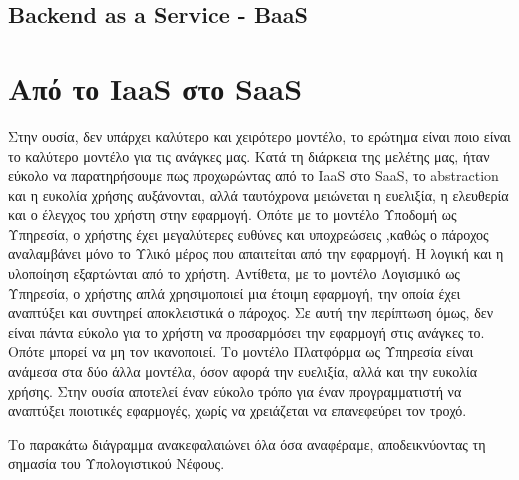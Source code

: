 \documentclass{article}
\begin{document}
\subsection{Backend as a Service - BaaS}







\section{Από το IaaS στο SaaS}
Στην ουσία, δεν υπάρχει καλύτερο και χειρότερο μοντέλο, το ερώτημα είναι ποιο είναι το καλύτερο μοντέλο για τις ανάγκες μας. Κατά τη διάρκεια της μελέτης μας, ήταν εύκολο να παρατηρήσουμε πως προχωρώντας από το IaaS στο SaaS, το abstraction και η ευκολία χρήσης αυξάνονται, αλλά ταυτόχρονα μειώνεται η ευελιξία, η ελευθερία και ο έλεγχος του χρήστη στην εφαρμογή. Οπότε με το μοντέλο Υποδομή ως Υπηρεσία, ο χρήστης έχει μεγαλύτερες ευθύνες και υποχρεώσεις ,καθώς ο πάροχος αναλαμβάνει μόνο το Υλικό μέρος που απαιτείται από την εφαρμογή. Η λογική και η υλοποίηση εξαρτώνται από το χρήστη. Αντίθετα, με το μοντέλο Λογισμικό ως Υπηρεσία, ο χρήστης απλά χρησιμοποιεί μια έτοιμη εφαρμογή, την οποία έχει αναπτύξει και συντηρεί αποκλειστικά ο πάροχος. Σε αυτή την περίπτωση όμως, δεν είναι πάντα εύκολο για το χρήστη να προσαρμόσει την εφαρμογή στις ανάγκες το. Οπότε μπορεί να μη τον ικανοποιεί. Το μοντέλο Πλατφόρμα ως Υπηρεσία είναι ανάμεσα στα δύο άλλα μοντέλα, όσον αφορά την ευελιξία, αλλά και την ευκολία χρήσης. Στην ουσία αποτελεί έναν εύκολο τρόπο για έναν προγραμματιστή να αναπτύξει ποιοτικές εφαρμογές, χωρίς να χρειάζεται να επανεφεύρει τον τροχό.

Το παρακάτω διάγραμμα ανακεφαλαιώνει όλα όσα αναφέραμε, αποδεικνύοντας τη σημασία του Υπολογιστικού Νέφους. 
\end{document}
